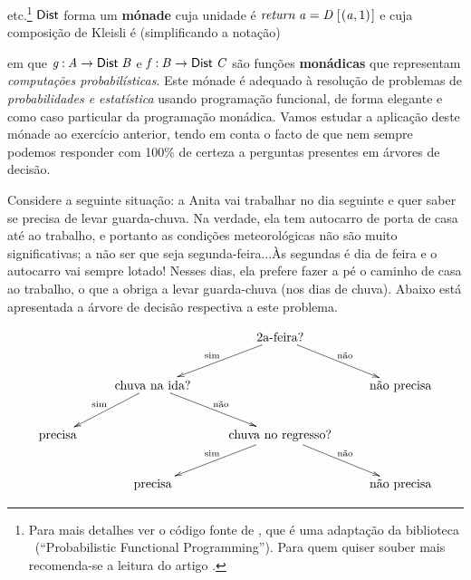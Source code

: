 \documentclass[a4paper]{article}
\newcommand{\Conid}[1]{\mathit{#1}}
\newcommand{\Varid}[1]{\mathit{#1}}
\def\resethooks{%
  \global\let\SaveRestoreHook\empty
  \global\let\ColumnHook\empty}
\let\hspre\empty
\let\hspost\empty
\begin{document}
etc.\footnote{Para mais detalhes ver o código fonte de \Probability, que é uma adaptação da
biblioteca \PFP\ (``Probabilistic Functional Programming''). Para quem quiser souber mais
recomenda-se a leitura do artigo \cite{EK06}.}
\ensuremath{\fun{Dist}} forma um \textbf{mónade} cuja unidade é \ensuremath{\Varid{return}\;\Varid{a}\mathrel{=}\Conid{D}\;[\mskip1.5mu (\Varid{a},\mathrm{1})\mskip1.5mu]} e cuja composição de Kleisli
é (simplificando a notação)
\resethooks
em que \ensuremath{\Varid{g}\mathbin{:}\Conid{A}\to \fun{Dist}\;\mathit B} e \ensuremath{\Varid{f}\mathbin{:}\mathit B\to \fun{Dist}\;\mathit C} são funções \textbf{monádicas} que representam
\emph{computações probabilísticas}.
Este mónade é adequado à resolução de problemas de
 \emph{probabilidades e estatística} usando programação funcional, de
 forma elegante e como caso particular da programação
 monádica. Vamos estudar a aplicação
 deste mónade ao exercício anterior, tendo em conta o facto de que nem
 sempre podemos responder com 100\% de certeza a perguntas presentes
 em árvores de decisão.


Considere a seguinte situação: a Anita vai
 trabalhar no dia seguinte
e quer saber se precisa de levar guarda-chuva.  Na verdade,
 ela tem autocarro de porta de casa até ao trabalho, e portanto
 as condições meteorológicas não são muito significativas; a não ser
 que seja segunda-feira...Às segundas é dia de feira e o autocarro vai
 sempre lotado! Nesses dias, ela prefere fazer a pé o caminho de casa
 ao trabalho, o que a obriga a levar guarda-chuva (nos dias de
 chuva). Abaixo está apresentada a árvore de decisão respectiva a este problema.

 \[
     \xymatrix{
     && \text{2a-feira?} \ar[dl]_{\text{sim}} \ar[dr]^{\text{não}} & \\
     & \text{chuva na ida?} \ar[dl]_{\text{sim}} \ar[dr]^{\text{não}}
      && \text{não precisa} \\
     \text{precisa} && \text{chuva no regresso?}
    \ar[dl]_{\text{sim}} \ar[dr]^{\text{não}} & \\
     &\text{precisa} && \text{não precisa}
     }
  \]
\end{document}

